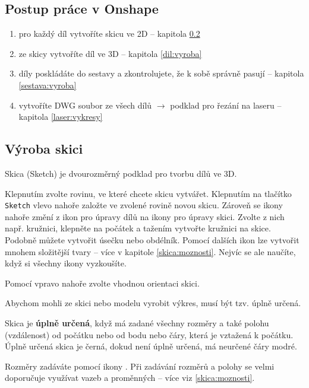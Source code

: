 \subsection{Postup práce v Onshape}
 
\begin{enumerate}
	\item pro každý díl vytvoříte skicu ve 2D -- kapitola \ref{skica:vyroba}
	
	\item ze skicy vytvoříte díl ve 3D -- kapitola \ref{dil:vyroba}
	
	\item díly poskládáte do sestavy a zkontrolujete, že k sobě správně pasují -- kapitola \ref{sestava:vyroba}
	
	\item vytvoříte DWG soubor ze všech dílů $\rightarrow$ podklad pro řezání na laseru -- kapitola \ref{laser:vykresy}	
\end{enumerate}



\subsection{Výroba skici} \label{skica:vyroba}


Skica (Sketch)  je dvourozměrný podklad pro tvorbu dílů ve 3D. 

Klepnutím zvolte rovinu, ve které chcete skicu vytvářet. Klepnutím na tlačítko {\tt Sketch} vlevo nahoře založte ve zvolené rovině novou skicu. 
Zároveň se ikony nahoře změní z ikon pro úpravy dílů na ikony pro úpravy skici. 
Zvolte z nich např. kružnici, klepněte na počátek a tažením vytvořte kružnici na skice. 
Podobně můžete vytvořit úsečku nebo obdélník. 
Pomocí dalších ikon lze vytvořit mnohem složitější tvary -- více v kapitole \ref{skica:moznosti}.
Nejvíc se ale naučíte, když si všechny ikony vyzkoušíte. 

Pomocí  vpravo nahoře zvolte vhodnou orientaci skici. 

Abychom mohli ze skici nebo modelu vyrobit výkres, musí být tzv. úplně určená.

Skica je \textbf{úplně určená}, když má zadané všechny rozměry a také polohu (vzdálenost) od počátku nebo od bodu nebo čáry, která je vztažená k počátku.
Úplně určená skica je černá, dokud není úplně určená, má neurčené čáry modré.  

Rozměry zadáváte pomocí ikony .
Při zadávání rozměrů a polohy se velmi doporučuje využívat vazeb a proměnných -- více viz  \ref{skica:moznosti}.


